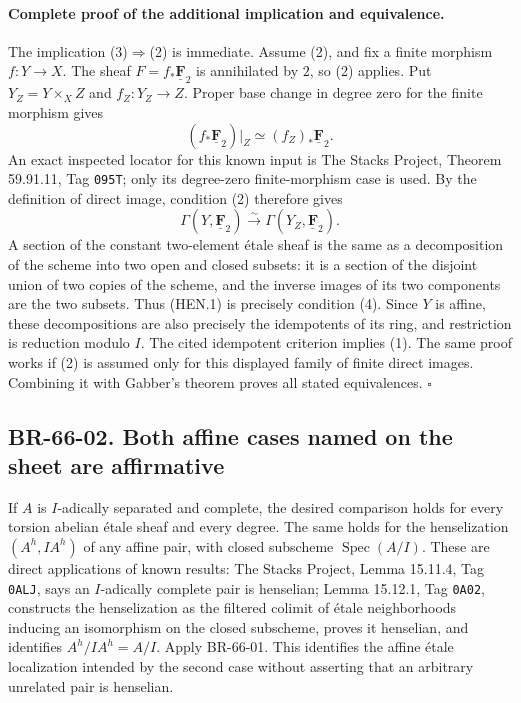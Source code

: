 \documentclass[11pt,a4paper]{article}
\theoremstyle{definition}\newtheorem{definition}[theorem]{Definition}
\theoremstyle{remark}\newtheorem{remark}[theorem]{Remark}
\begin{document}
\paragraph{Complete proof of the additional implication and equivalence.}
The implication (3)$\Rightarrow$(2) is immediate. Assume (2), and
fix a finite morphism $f:Y\to X$. The sheaf
$F=f_*\underline{\mathbf F}_2$ is annihilated by $2$, so (2) applies.
Put $Y_Z=Y\times_X Z$ and $f_Z:Y_Z\to Z$. Proper base change in
degree zero for the finite morphism gives
\[
 (f_*\underline{\mathbf F}_2)|_Z
       \simeq (f_Z)_*\underline{\mathbf F}_2.
\]
An exact inspected locator for this known input is The Stacks
Project, Theorem 59.91.11, Tag \nolinkurl{095T}; only its degree-zero
finite-morphism case is used. By the definition of direct image,
condition (2) therefore gives
\[
 \Gamma(Y,\underline{\mathbf F}_2)
       \xrightarrow{\sim}\Gamma(Y_Z,\underline{\mathbf F}_2).
 \tag{HEN.1}
\]
A section of the constant two-element \'etale sheaf is the same as
a decomposition of the scheme into two open and closed subsets:
it is a section of the disjoint union of two copies of the scheme,
and the inverse images of its two components are the two subsets.
Thus (HEN.1) is precisely condition (4). Since $Y$ is affine,
these decompositions are also precisely the idempotents of its ring,
and restriction is reduction modulo $I$. The cited idempotent
criterion implies (1). The same proof works if (2) is assumed only
for this displayed family of finite direct images. Combining it with
Gabber's theorem proves all stated equivalences. \(\square\)

\subsection{BR-66-02. Both affine cases named on the sheet are affirmative}
If $A$ is $I$-adically separated and complete, the desired comparison
holds for every torsion abelian \'etale sheaf and every degree.
The same holds for the henselization $(A^h,IA^h)$ of any affine pair,
with closed subscheme $\operatorname{Spec}(A/I)$.
These are direct applications of known results: The Stacks Project,
Lemma 15.11.4, Tag \nolinkurl{0ALJ}, says an $I$-adically complete pair is
henselian; Lemma 15.12.1, Tag \nolinkurl{0A02}, constructs the henselization
as the filtered colimit of \'etale neighborhoods inducing an isomorphism
on the closed subscheme, proves it henselian, and identifies
$A^h/IA^h=A/I$. Apply BR-66-01. This identifies the affine \'etale
localization intended by the second case without asserting that an
arbitrary unrelated pair is henselian.
\end{document}
